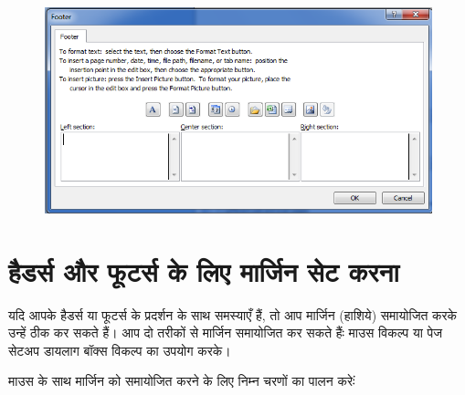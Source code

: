 \begin{figure}[H]
\centering
\includegraphics[scale=0.4]{src/images/chapter1/chapter1_fig46.png}
\end{figure}
						
\section{हैडर्स और फूटर्स के लिए मार्जिन सेट करना}\label{id-1.24}

यदि आपके हैडर्स या फूटर्स के प्रदर्शन के साथ समस्याएँ हैं, तो आप मार्जिन (हाशिये) समायोजित करके उन्हें ठीक कर सकते हैं। आप दो तरीकों से मार्जिन समायोजित कर सकते हैंः माउस विकल्प या पेज सेटअप डायलाग बॉक्स विकल्प का उपयोग करके।


माउस के साथ मार्जिन को समायोजित करने के लिए निम्न चरणों का पालन करेःं

